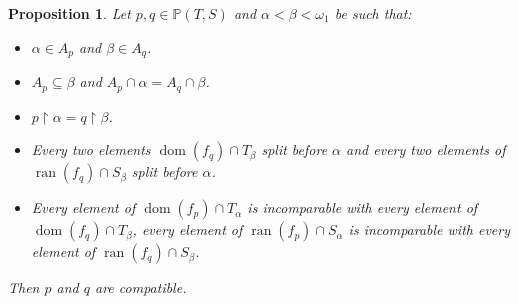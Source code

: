 \documentclass{amsart}
\newtheorem{proposition}[theorem]{Proposition}
\theoremstyle{definition}
\renewcommand{\P}{\mathbb{P}}
\newcommand{\seb}{\subseteq}
\newcommand{\res}{\restriction}
\DeclareMathOperator{\dom}{dom}
\DeclareMathOperator{\ran}{ran}
\begin{document}
\begin{proposition}\label{lem:compat-cond}
  Let $p,q \in \P(T,S)$ and $\alpha < \beta < \omega_{1}$ be such that:
  \begin{itemize}\itemsep0em
    \item $\alpha \in A_{p}$ and $\beta \in A_{q}$.
    \item $A_{p} \seb \beta$ and $A_{p} \cap \alpha = A_{q} \cap \beta$.
    \item $p \res \alpha = q \res \beta$.
    \item Every two elements $\dom(f_{q}) \cap T_{\beta}$
    split before $\alpha$ and every two elements of
    $\ran(f_{q}) \cap S_{\beta}$ split before $\alpha$.
    \item Every element of $\dom(f_{p}) \cap T_{\alpha}$ is incomparable
    with every element of $\dom(f_{q}) \cap T_{\beta}$, every element
    of $\ran(f_{p}) \cap S_{\alpha}$ is incomparable with
    every element of $\ran(f_{q}) \cap S_{\beta}$.
  \end{itemize}
  Then $p$ and $q$ are compatible.
\end{proposition}
\end{document}
